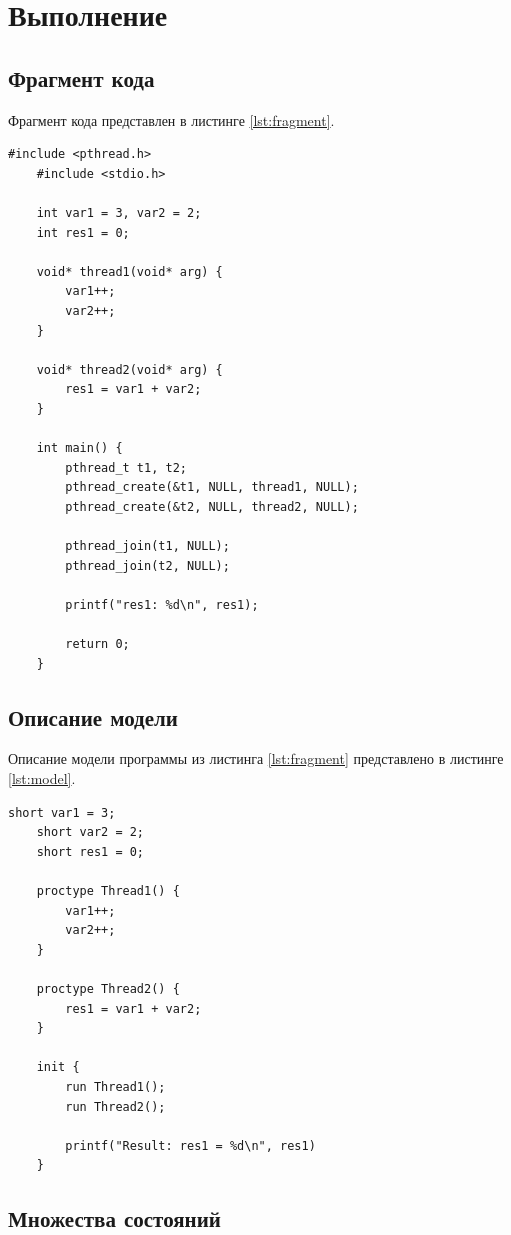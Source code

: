 \section{Выполнение}

\subsection{Фрагмент кода}

Фрагмент кода представлен в листинге \ref{lst:fragment}.

\begin{lstlisting}[label=lst:fragment,caption=Фрагмент кода.]
	#include <pthread.h>
	#include <stdio.h>

	int var1 = 3, var2 = 2;
	int res1 = 0;

	void* thread1(void* arg) {
		var1++;
		var2++;
	}

	void* thread2(void* arg) {
		res1 = var1 + var2;
	}

	int main() {
		pthread_t t1, t2;
		pthread_create(&t1, NULL, thread1, NULL);
		pthread_create(&t2, NULL, thread2, NULL);

		pthread_join(t1, NULL);
		pthread_join(t2, NULL);

		printf("res1: %d\n", res1);

		return 0;
	}
\end{lstlisting}

\subsection{Описание модели}

Описание модели программы из листинга \ref{lst:fragment} представлено в листинге \ref{lst:model}.

\begin{lstlisting}[label=lst:model,caption=Описание модели.]
	short var1 = 3;
	short var2 = 2;
	short res1 = 0;

	proctype Thread1() {
		var1++;
		var2++;
	}

	proctype Thread2() {
		res1 = var1 + var2;
	}

	init {
		run Thread1();
		run Thread2();

		printf("Result: res1 = %d\n", res1)
	}
\end{lstlisting}

\subsection{Множества состояний}

